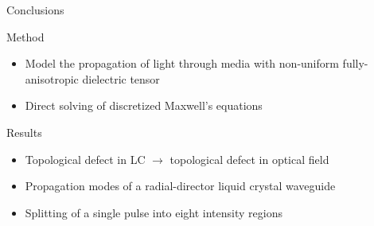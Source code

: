 \documentclass{beamer}
\newlength{\wideitemsep}
\let\olditem\item
\renewcommand{\item}{\setlength{\itemsep}{\wideitemsep}\olditem}
\begin{document}
\begin{frame}{Conclusions}
\begin{block}{Method}
 \begin{itemize}
  \item Model the propagation of light through media with non-uniform fully-anisotropic dielectric tensor
  \item Direct solving of discretized Maxwell's equations
 \end{itemize}
\end{block}
\begin{block}{Results}
 \begin{itemize}
  \item Topological defect in LC $\rightarrow$ topological defect in optical field
  \item Propagation modes of a radial-director liquid crystal waveguide
  \item Splitting of a single pulse into eight intensity regions
 \end{itemize}
\end{block}
\end{frame}
\end{document}

